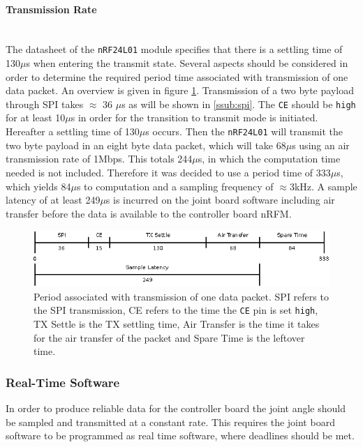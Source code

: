 \paragraph{Transmission Rate} %
\label{par:transmission_rate}~\\
The datasheet of the \texttt{nRF24L01} module specifies that there is a settling time of 130$\mu$s when entering the transmit state.
Several aspects should be considered in order to determine the required period time associated with transmission of one data packet.
An overview is given in figure \ref{fig:tiny_period}.
Transmission of a two byte payload through SPI takes $\approx$ 36 $\mu$s as will be shown in \ref{ssub:spi}.
The \texttt{CE} should be \texttt{high} for at least 10$\mu$s in order for the transition to transmit mode is initiated.
Hereafter a settling time of 130$\mu$s occurs.
Then the \texttt{nRF24L01} will transmit the two byte payload in an eight byte data packet, which will take 68$\mu$s using an air transmission rate of 1Mbps.
This totals 244$\mu$s, in which the computation time needed is not included.
Therefore it was decided to use a period time of 333$\mu$s, which yields 84$\mu$s to computation and a sampling frequency of $\approx$3kHz.
A sample latency of at least 249$\mu$s is incurred on the joint board software including air transfer before the data is available to the controller board nRFM.
\begin{figure}[h]
	\centering
	\includegraphics[width=1\linewidth]{graphics/latency_diagram}
	\caption[Period of wireless transmission]{Period associated with transmission of one data packet. SPI refers to the SPI transmission, CE refers to the time the \texttt{CE} pin is set \texttt{high}, TX Settle is the TX settling time, Air Transfer is the time it takes for the air transfer of the packet and Spare Time is the leftover time.}
	\label{fig:tiny_period}
\end{figure}

\subsubsection{Real-Time Software}
In order to produce reliable data for the controller board the joint angle should be sampled and transmitted at a constant rate.
This requires the joint board software to be programmed as real time software, where deadlines should be met.

